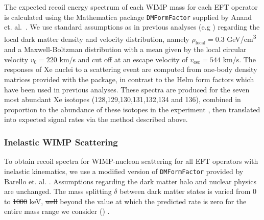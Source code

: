 The expected recoil energy spectrum of each WIMP mass for each EFT operator is calculated using the Mathematica package \texttt{DMFormFactor} supplied by Anand et. al.~\cite{Fitzpatrick:MathTools,Anand:MathTools}. We use standard assumptions as in previous analyses (e.g \cite{xe100_run_combination}) regarding the local dark matter density and velocity distribution, namely $\rho_\mathrm{local} = 0.3$ GeV/cm\textsuperscript{3} and a Maxwell-Boltzman distribution with a mean given by the local circular velocity $v_0 = 220$ km/s and cut off at an escape velocity of $v_\mathrm{esc} = 544$ km/s. The responses of Xe nuclei to a scattering event are computed from one-body density matrices provided with the package, in contrast to the Helm form factors which have been used in previous analyses. These spectra are produced for the seven most abundant Xe isotopes (128,129,130,131,132,134 and 136), combined in proportion to the abundance of these isotopes in the experiment \cite{xe100_run10_sd}, then translated into expected signal rates via the method described above.

\subsubsection{Inelastic WIMP Scattering}
\label{subsubsec:Inelastic}
To obtain recoil spectra for WIMP-nucleon scattering for all EFT operators with inelastic kinematics, we use a modified version of \texttt{DMFormFactor} provided by Barello et. al. \cite{InelasticMath}. Assumptions regarding the dark matter halo and nuclear physics are unchanged. The mass splitting $\delta$ between dark matter states is varied from 0 to \sout{1000}  keV, \sout{well} beyond the value at which the predicted rate is zero for the entire mass range we consider () .
